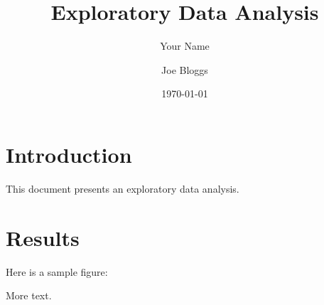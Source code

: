 \documentclass{article}
\title{Exploratory Data Analysis}
\author{Your Name}
\date{\today}
\begin{document}
\author{Joe Bloggs}

\maketitle{}

\section{Introduction}
This document presents an exploratory data analysis.

\section{Results}
Here is a sample figure:

\begin{figure}[h]
\end{figure}

\clearpage{}

More text.
\end{document}
